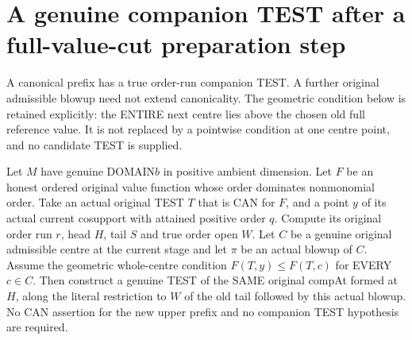 \section{A genuine companion TEST after a full-value-cut preparation step}

A canonical prefix has a true order-run companion TEST. A further original
admissible blowup need not extend canonicality. The geometric condition below
is retained explicitly: the ENTIRE next centre lies above the chosen old
full reference value. It is not replaced by a pointwise condition at one
centre point, and no candidate TEST is supplied.

\begin{theorem}
\label{hir:original-upper-cut-next-companion-actual-test}
\leanok
Let $M$ have genuine DOMAIN$b$ in positive ambient dimension. Let $F$ be an
honest ordered original value function whose order dominates nonmonomial
order. Take an actual original TEST $T$ that is CAN for $F$, and a point $y$
of its actual current cosupport with attained positive order $q$. Compute
its original order run $r$, head $H$, tail $S$ and true order open $W$.
Let $C$ be a genuine original admissible centre at the current stage and let
$\pi$ be an actual blowup of $C$. Assume the geometric whole-centre condition
$F(T,y)\le F(T,c)$ for EVERY $c\in C$. Then construct a genuine TEST of the
SAME original compAt formed at $H$, along the literal restriction to $W$ of
the old tail followed by this actual blowup. No CAN assertion for the new
upper prefix and no companion TEST hypothesis are required.
\end{theorem}
